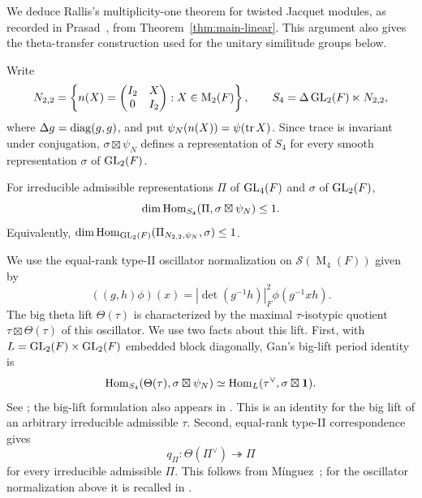 We deduce Rallis's multiplicity-one theorem for twisted Jacquet
modules, as recorded in Prasad~\cite[Theorem~1]{PrasadShalika}, from
Theorem~\ref{thm:main-linear}. This argument also gives the theta-transfer
construction used for the unitary similitude groups below.

Write
\[
 N_{2,2}=\left\{n(X)=\begin{pmatrix}I_2&X\\0&I_2\end{pmatrix}:
                                  X\in\operatorname{M}_2(F)\right\},
 \qquad S_4=\Delta\operatorname{GL}_2(F)\ltimes N_{2,2},
\]
where $\Delta g=\operatorname{diag}(g,g)$, and put
$\psi_N(n(X))=\psi(\operatorname{tr} X)$. Since trace is invariant under
conjugation, $\sigma\boxtimes\psi_N$ defines a representation
of $S_4$ for every smooth representation $\sigma$ of $\operatorname{GL}_2(F)$.

\begin{corollary}\label{cor:gl-shalika}
For irreducible admissible representations $\Pi$ of $\operatorname{GL}_4(F)$
and $\sigma$ of $\operatorname{GL}_2(F)$,
\[
 \dim\operatorname{Hom}_{S_4}(\Pi,\sigma\boxtimes\psi_N)\leq1.
\]
Equivalently, $\dim\operatorname{Hom}_{\operatorname{GL}_2(F)}(\Pi_{N_{2,2},\psi_N},\sigma)\leq1$.
\end{corollary}

We use the equal-rank type-II oscillator normalization on
$\mathcal S(\operatorname{M}_4(F))$ given by
\[
 ((g,h)\phi)(x)=|\det(g^{-1}h)|_F^2\phi(g^{-1}xh).
\]
The big theta lift $\Theta(\tau)$ is characterized by the maximal
$\tau$-isotypic quotient $\tau\boxtimes\Theta(\tau)$ of this
oscillator. We use two facts about this lift. First, with
$L=\operatorname{GL}_2(F)\times\operatorname{GL}_2(F)$ embedded block diagonally,
Gan's big-lift period identity is
\begin{equation}\label{eq:gl-big-transfer}
 \operatorname{Hom}_{S_4}(\Theta(\tau),\sigma\boxtimes\psi_N)
 \simeq\operatorname{Hom}_L(\tau^\vee,\sigma\boxtimes\mathbf1).
\end{equation}
See \cite[Theorem~3.1]{GanPeriods}; the big-lift formulation
also appears in \cite[Proposition~3.5]{YangV1}.
This is an identity for the big lift of an arbitrary irreducible
admissible $\tau$. Second, equal-rank type-II correspondence gives
\begin{equation}\label{eq:gl-theta-quotient}
 q_\Pi:\Theta(\Pi^\vee)\twoheadrightarrow\Pi
\end{equation}
for every irreducible admissible $\Pi$.
This follows from M\'{i}nguez~\cite[Theorem~1]{Minguez08};
for the oscillator normalization above it is recalled in
\cite[Theorem~1.2 and the preceding paragraph]{FangSunXue}.

